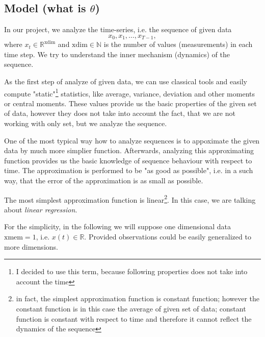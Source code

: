  \subsection{Model (what is $\theta$)}

 In our project, we analyze the time-series, i.e. the sequence of given data
 \begin{equation}
  \label{eq:timeseries}
	x_0, x_1, \dots, x_{T-1},
 \end{equation}
 where $x_t \in \mathbb{R}^{\mathrm{xdim}}$ and $\mathrm{xdim} \in \mathbb{N}$ is the number of values (measurements) in each time step. 
 We try to understand the inner mechanism (dynamics) of the sequence. \newline
 
 As the first step of analyze of given data, we can use classical tools and easily compute "static"\footnote{I decided to use this term, because following properties does not take into account the time} statistics, like average, variance, deviation and other moments or central moments.
 These values provide us the basic properties of the given set of data, however they does not take into account the fact, that we are not working with only set, but we analyze the sequence.

 One of the most typical way how to analyze sequences is to appoximate the given data by much more simplier function. Afterwards, analyzing this approximating function provides us the basic knowledge of sequence behaviour with respect to time. 
 The approximation is performed to be "as good as possible", i.e. in a such way, that the error of the approximation is as small as possible.
 
 The most simplest approximation function is linear\footnote{in fact, the simplest approximation function is constant function; however the constant function is in this case the average of given set of data; constant function is constant with respect to time and therefore it cannot reflect the dynamics of the sequence}.
 In this case, we are talking about \emph{linear regression}.
 
 For the simplicity, in the following we will suppose one dimensional data $\mathrm{xmem} = 1$, i.e. $x(t) \in \mathbb{R}$. 
 Provided observations could be easily generalized to more dimensions.
 
